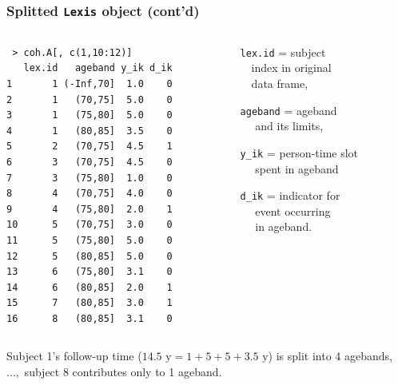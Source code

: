 \documentclass[handout,12pt]{beamer}
\begin{document}
\begin{frame}[fragile]
\frametitle{Splitted \texttt{Lexis} object (cont'd)}
  
\begin{columns}[t] 
    \begin{column}{0.40\textwidth}
\scriptsize
\begin{verbatim}
 > coh.A[, c(1,10:12)] 
   lex.id   ageband y_ik d_ik
1       1 (-Inf,70]  1.0    0
2       1   (70,75]  5.0    0
3       1   (75,80]  5.0    0
4       1   (80,85]  3.5    0
5       2   (70,75]  4.5    1
6       3   (70,75]  4.5    0
7       3   (75,80]  1.0    0
8       4   (70,75]  4.0    0
9       4   (75,80]  2.0    1
10      5   (70,75]  3.0    0
11      5   (75,80]  5.0    0
12      5   (80,85]  5.0    0
13      6   (75,80]  3.1    0
14      6   (80,85]  2.0    1
15      7   (80,85]  3.0    1
16      8   (80,85]  3.1    0
\end{verbatim}
\normalsize
\end{column}
% 
\begin{column}{0.50\textwidth}
\bi
\item[ ]
\item[ ] \verb|lex.id| = subject \\ $\quad$index 
in original \\ $\quad$data frame,
\item[ ] \verb|ageband| = ageband \\
            $\quad$ and  its limits, 
\item[ ] \verb|y_ik| = person-time slot 
        \\ $\quad$ 
       spent in ageband
\item[ ] \verb|d_ik| = indicator for \\
   $\quad$ event occurring \\
   $\quad$ in ageband.
\ei
\end{column}
\end{columns}
 
 \bigskip
Subject 1's follow-up time ($14.5\mbox{ y} = 1+ 5 + 5 + 3.5\mbox{ y}$)
is split into 4 agebands,
$\dots,$ subject 8 contributes only to 1 ageband.

\end{frame} 

\end{document}
